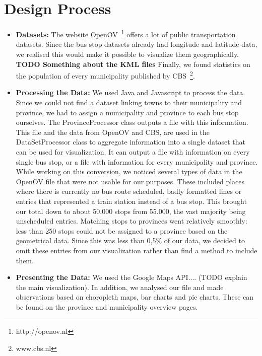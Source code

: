 \documentclass[a4paper,11pt]{article}
\begin{document}
\section{Design Process}
\begin{itemize}
\item \textbf{Datasets:}
The website OpenOV~\footnote{http://openov.nl} offers a lot of public transportation datasets. Since the bus stop datasets already had longitude and latitude data, we realised this would make it possible to visualize them geographically. 
\textbf{TODO Something about the KML files }
Finally, we found statistics on the population of every municipality published by CBS~\footnote{www.cbs.nl}.
\item \textbf{Processing the Data:}
We used Java and Javascript to process the data. Since we could not find a dataset linking towns to their municipality and province, we had to assign a municipality and province to each bus stop ourselves. The ProvinceProcessor class outputs a file with this information.
This file and the data from OpenOV and CBS, are used in the DataSetProcessor class to aggregate information into a single dataset that can be used for visualization. It can output a file with information on every single bus stop, or a file with information for every municipality and province.
While working on this conversion, we noticed several types of data in the OpenOV file that were not usable for our purposes. These included places where there is currently no bus route scheduled, badly formatted lines or entries that represented a train station instead of a bus stop. This brought our total down to about 50.000 stops from 55.000, the vast majority being unscheduled entries. Matching stops to provinces went relatively smoothly: less than 250 stops could not be assigned to a province based on the geometrical data. Since this was less than 0,5\% of our data, we decided to omit these entries from our visualization rather than find a method to include them.
\item \textbf{Presenting the Data:}
We used the Google Maps API.... (TODO explain the main visualization).
In addition, we analysed our file and made observations based on choropleth maps, bar charts and pie charts. These can be found on the province and municipality overview pages.
\end{itemize}
\end{document}
